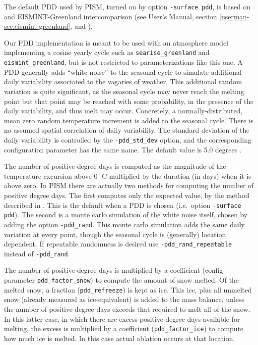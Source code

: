 \documentclass[titlepage,letterpaper,final]{scrartcl}
\newcommand{\intextoption}[1]{\texttt{-#1}\optindex{\texttt{-#1}}}
\begin{document}
The default PDD used by PISM, turned on by option \texttt{-surface pdd}, is based on \cite{CalovGreve05} and EISMINT-Greenland intercomparison (see User's Manual, section \ref*{userman-sec:eismint-greenland}, and \cite{RitzEISMINT}).

Our PDD implementation is meant to be used with an atmosphere model implementing a cosine yearly cycle such as \texttt{searise_greenland} and \texttt{eismint_greenland}, but is not restricted to parameterizations like this one. A PDD generally adds ``white noise'' to the seasonal cycle to simulate additional daily variability associated to the vagaries of weather.  This additional random variation is quite significant, as the seasonal cycle may never reach the melting point but that point may be reached with some probability, in the presence of the daily variability, and thus melt may occur.  Concretely, a normally-distributed, mean zero random temperature increment is added to the seasonal cycle. There is no assumed spatial correlation of daily variability. The standard deviation of the daily variability is controlled by the \intextoption{pdd_std_dev} option, and the corresponding configuration parameter has the same name. The default value is 5.0 degrees \cite{RitzEISMINT}.

The number of positive degree days is computed as the magnitude of the temperature excursion above $0\!\phantom{|}^\circ \text{C}$ multiplied by the duration (in days) when it is above zero. In PISM there are actually two methods for computing the number of positive degree days. The first computes only the expected value, by the method described in \cite{CalovGreve05}. This is the default when a PDD is chosen (i.e.~option \texttt{-surface pdd}). The second is a monte carlo simulation of the white noise itself, chosen by adding the option \intextoption{pdd_rand}. This monte carlo simulation adds the same daily variation at every point, though the seasonal cycle is (generally) location dependent. If repeatable randomness is desired use \intextoption{pdd_rand_repeatable} instead of \texttt{-pdd_rand}.

The number of positive degree days is multiplied by a coefficient (config parameter \texttt{pdd_factor_snow}) to compute the amount of snow melted. Of the melted snow, a fraction (\texttt{pdd_refreeze}) is kept as ice. This ice, plus all unmelted snow (already measured as ice-equivalent) is added to the mass balance, unless the number of positive degree days exceeds that required to melt all of the snow. In this latter case, in which there are excess positive degree days available for melting, the excess is multiplied by a coefficient (\texttt{pdd_factor_ice}) to compute how much ice is melted. In this case actual ablation occurs at that location.
\end{document}
